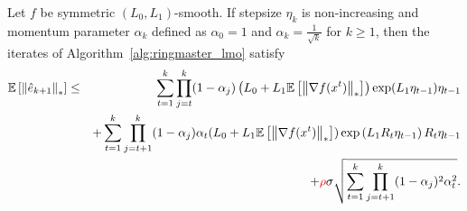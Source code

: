\documentclass{article}
\begin{document}
\begin{lemma}
    \label{lem:error_bound}
    Let $f$ be symmetric $(L_0, L_1)$-smooth. If stepsize $\eta_k$ is non-increasing and momentum parameter $\alpha_k$ defined as $\alpha_0 =1$ and $\alpha_k = \frac{1}{\sqrt{k}}$ for $k \ge 1$, then  the iterates of Algorithm~\ref{alg:ringmaster_lmo} satisfy 
    \begin{eqnarray*}
        {\mathbb{E}}\left[\left\| \hat{e}_{k+1} \right\|_*\right] &\le&  \sum_{t=1}^k \prod_{j=t}^{k}(1-\alpha_j) \left(L_0 + L_1{\mathbb{E}}\left[\left\| \nabla f(x^t) \right\|_*\right]\right)\exp(L_1\eta_{t-1})\eta_{t-1}\\
        && + \sum_{t=1}^k \prod_{j=t+1}^{k}(1-\alpha_j) \alpha_t (L_0 + L_1 {\mathbb{E}}\left[\left\| \nabla f(x^t) \right\|_*\right])\exp\left(L_1 R_t\eta_{t-1}\right)R_t\eta_{t-1}\\
        && + {\color{red} \rho} \sigma\sqrt{\sum_{t=1}^k \prod_{j=t+1}^{k}(1-\alpha_j)^2 \alpha_t^2}.
    \end{eqnarray*}
\end{lemma}
\end{document}
